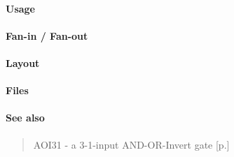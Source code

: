 \paragraph{Usage}

\paragraph{Fan-in / Fan-out}

\paragraph{Layout}

\paragraph{Files}

\paragraph{See also}
\begin{quote}
    AOI31 - a 3-1-input AND-OR-Invert gate [p.\pageref{AOI31}]
\end{quote}
